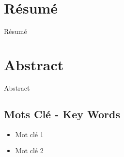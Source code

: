 \section*{Résumé}
Résumé

\section*{Abstract}
Abstract

\subsection*{Mots Clé - Key Words}
\begin{itemize}
    \item Mot clé 1
    \item Mot clé 2
\end{itemize}
\clearpage
